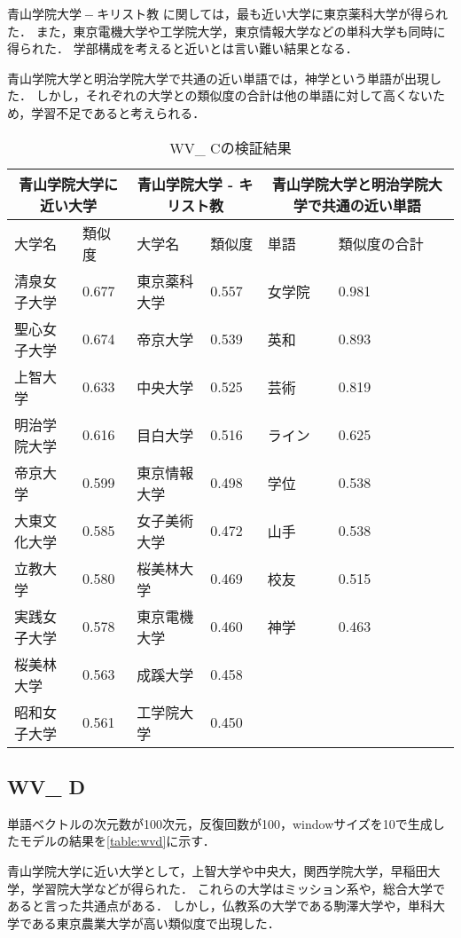 $ 青山学院大学 - キリスト教 $ に関しては，最も近い大学に東京薬科大学が得られた．
また，東京電機大学や工学院大学，東京情報大学などの単科大学も同時に得られた．
学部構成を考えると近いとは言い難い結果となる．

青山学院大学と明治学院大学で共通の近い単語では，神学という単語が出現した．
しかし，それぞれの大学との類似度の合計は他の単語に対して高くないため，学習不足であると考えられる．

\begin{table}[H]
\caption{WV\_ Cの検証結果}
\centering
\footnotesize
\begin{tabular}{ll|ll|ll}
\hline
\multicolumn{2}{c}{青山学院大学に近い大学} & \multicolumn{2}{c}{青山学院大学 - キリスト教} & \multicolumn{2}{c}{青山学院大学と明治学院大学で共通の近い単語}
\\ \hline
大学名 & 類似度 & 大学名 & 類似度 & 単語 & 類似度の合計
\\ \hline \hline
清泉女子大学 & 0.677 & 東京薬科大学 & 0.557 & 女学院 & 0.981\\
聖心女子大学 & 0.674 & 帝京大学 & 0.539 & 英和 & 0.893\\
上智大学 & 0.633 & 中央大学 & 0.525 & 芸術 & 0.819\\
明治学院大学 & 0.616 & 目白大学 & 0.516 & ライン & 0.625\\
帝京大学 & 0.599 & 東京情報大学 & 0.498 & 学位 & 0.538\\
大東文化大学 & 0.585 & 女子美術大学 & 0.472 & 山手 & 0.538\\
立教大学 & 0.580 & 桜美林大学 & 0.469 & 校友 & 0.515\\
実践女子大学 & 0.578 & 東京電機大学 & 0.460 & 神学 & 0.463\\
桜美林大学 & 0.563 & 成蹊大学 & 0.458 & & \\
昭和女子大学 & 0.561 & 工学院大学 & 0.450 & & \\ \hline
\end{tabular}
\label{table:wvc}
\end{table}


\subsection{WV\_ D}
単語ベクトルの次元数が100次元，反復回数が100，windowサイズを10で生成したモデルの結果を\ref{table:wvd}に示す．

青山学院大学に近い大学として，上智大学や中央大，関西学院大学，早稲田大学，学習院大学などが得られた．
これらの大学はミッション系や，総合大学であると言った共通点がある．
しかし，仏教系の大学である駒澤大学や，単科大学である東京農業大学が高い類似度で出現した．

